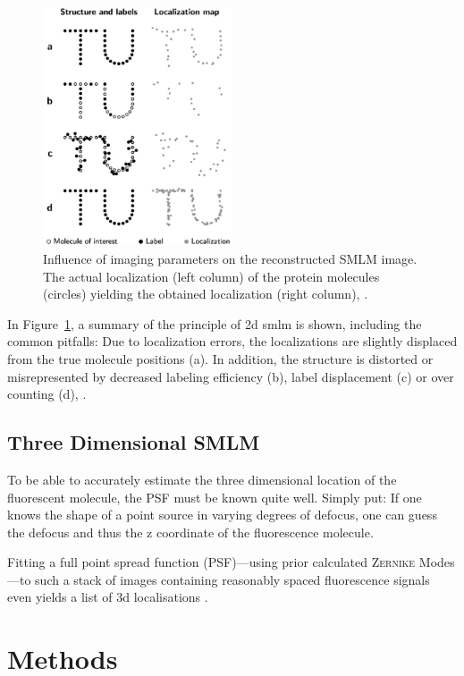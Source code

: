 \documentclass[11pt, a4paper, oneside, twocolumn]{report}
\renewcommand{\t}{\todo}
\begin{document}
\begin{figure}[h]
  \centering \includegraphics[width=0.5\textwidth]{2dsmlm.png}
  \caption{Influence of imaging parameters on the reconstructed SMLM
    image. The actual localization (left column) of the protein
    molecules (circles) yielding the obtained localization (right
    column), \cite{smlm}.}
  \label{f:2dsmlm}
\end{figure}

In Figure~\ref{f:2dsmlm}, a summary of the principle of 2d \gls{smlm}
is shown, including the common pitfalls: Due to localization errors,
the localizations are slightly displaced from the true molecule
positions (a). In addition, the structure is distorted or
misrepresented by decreased labeling efficiency (b), label
displacement (c) or over counting (d), \cite{smlm}.


\section{Three Dimensional SMLM}

To be able to accurately estimate the three dimensional location of
the fluorescent molecule, the PSF must be known quite well. Simply
put: If one knows the shape of a point source in varying degrees of
defocus, one can guess the defocus and thus the z coordinate of the
fluorescence molecule.

Fitting a full point spread function (PSF)---using prior calculated
\textsc{Zernike} Modes---to such a stack of images containing reasonably spaced
fluorescence signals even yields a list of 3d localisations \t{ref}.


\clearpage\chapter{Methods}
\end{document}
